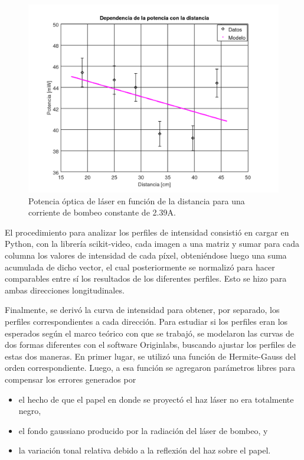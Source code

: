 \documentclass[10pt, a4paper]{article}%
\begin{document}
\begin{multicols}{2}
\begin{figure}[H]
    \centering
    \includegraphics[scale=0.4]{Graficos/potvsdist.png}
    \caption{Potencia óptica de láser en función de la distancia para una corriente de bombeo constante de 2.39A.}
    \label{laservsdist}
\end{figure}

El procedimiento para analizar los perfiles de intensidad consistió en cargar en Python, con la librería scikit-video, cada imagen a una matriz y sumar para cada columna los valores de intensidad de cada píxel, obteniéndose luego una suma acumulada de dicho vector, el cual posteriormente se normalizó para hacer comparables entre sí los resultados de los diferentes perfiles. Esto se hizo para ambas direcciones longitudinales. 

Finalmente, se derivó la curva de intensidad para obtener, por separado, los perfiles correspondientes a cada dirección. Para estudiar si los perfiles eran los esperados según el marco teórico con que se trabajó, se modelaron las curvas de dos formas diferentes con el software Originlabs, buscando ajustar los perfiles de estas dos maneras. En primer lugar, se utilizó una función de Hermite-Gauss del orden correspondiente. Luego, a esa función se agregaron parámetros libres para compensar los errores generados por

\begin{itemize}
    \item el hecho de que el papel en donde se proyectó el haz láser no era totalmente negro,
    \item el fondo gaussiano producido por la radiación del láser de bombeo, y
    \item la variación tonal relativa debido a la reflexión del haz sobre el papel.
\end{itemize}



\end{multicols}
\end{document}
